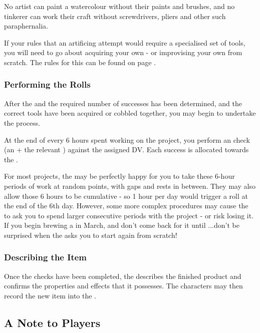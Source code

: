 No artist can paint a watercolour without their paints and brushes, and no tinkerer can work their craft without screwdrivers, pliers and other such paraphernalia. 

If your  rules that an artificing attempt would require a specialised set of tools, you will need to go about acquiring your own - or improvising your own from scratch. The rules for this can be found on page \pageref{S:Tools}. 



\subsubsection{Performing the Rolls}

After the  and the required number of successes has been determined, and the correct tools have been acquired or cobbled together, you may begin to undertake the  process. 

At the end of every 6 hours spent working on the project, you perform an  check (an  + the relevant ) against the assigned DV. Each success is allocated towards the . 

For most projects, the  may be perfectly happy for you to take these 6-hour periods of work at random points, with gaps and rests in between. They may also allow those 6 hours to be cumulative - so 1 hour per day would trigger a roll at the end of the 6th day. However, some more complex procedures may cause the  to ask you to spend larger consecutive periods with the project - or risk losing it. If you begin brewing a  in March, and don't come back for it until ...don't be surprised when the  asks you to start again from scratch!
\subsubsection{Describing the Item}

Once the checks have been completed, the  describes the finished product and confirms the properties and effects that it possesses. The characters may then record the new item into the .


\subsection{A Note to Players}

